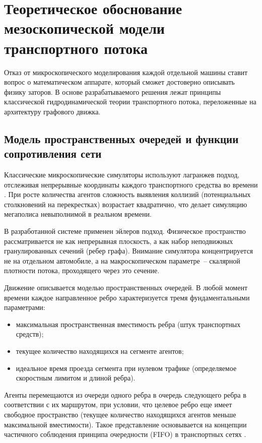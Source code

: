 \section{Теоретическое обоснование мезоскопической модели транспортного потока}\label{sec:mesoscopic_model}

Отказ от микроскопического моделирования каждой отдельной машины ставит вопрос о математическом аппарате, который сможет достоверно описывать физику заторов. В основе разрабатываемого решения лежат принципы классической гидродинамической теории транспортного потока, переложенные на архитектуру графового движка.

\subsection{Модель пространственных очередей и функции сопротивления сети}\label{subsec:spatial_queues}
Классические микроскопические симуляторы используют лагранжев подход, отслеживая непрерывные координаты каждого транспортного средства во времени \cite{artemov2021modeling, yuan2012realtime}. При росте количества агентов сложность выявления коллизий (потенциальных столкновений на перекрестках) возрастает квадратично, что делает симуляцию мегаполиса невыполнимой в реальном времени.

В разработанной системе применен эйлеров подход. Физическое пространство рассматривается не как непрерывная плоскость, а как набор неподвижных гранулированных сечений (ребер графа). Внимание симулятора концентрируется не на отдельном автомобиле, а на макроскопическом параметре~-- скалярной плотности потока, проходящего через это сечение.

Движение описывается моделью пространственных очередей. В любой момент времени каждое направленное ребро характеризуется тремя фундаментальными параметрами:
\begin{itemize}
    \item максимальная пространственная вместимость ребра (штук транспортных средств);
    \item текущее количество находящихся на сегменте агентов;
    \item идеальное время проезда сегмента при нулевом трафике (определяемое скоростным лимитом и длиной ребра).
\end{itemize}

Агенты перемещаются из очереди одного ребра в очередь следующего ребра в соответствии с их маршрутом, при условии, что целевое ребро еще имеет свободное пространство (текущее количество находящихся агентов меньше максимальной вместимости). Такое представление основывается на концепции частичного соблюдения принципа очередности (FIFO) в транспортных сетях \cite{coogan2015mixed}.

